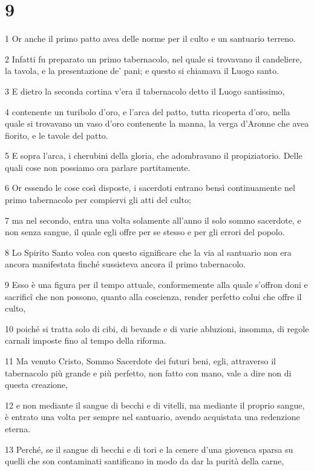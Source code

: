 \chapter{9}

\par 1 Or anche il primo patto avea delle norme per il culto e un santuario terreno.
\par 2 Infatti fu preparato un primo tabernacolo, nel quale si trovavano il candeliere, la tavola, e la presentazione de' pani; e questo si chiamava il Luogo santo.
\par 3 E dietro la seconda cortina v'era il tabernacolo detto il Luogo santissimo,
\par 4 contenente un turibolo d'oro, e l'arca del patto, tutta ricoperta d'oro, nella quale si trovavano un vaso d'oro contenente la manna, la verga d'Aronne che avea fiorito, e le tavole del patto.
\par 5 E sopra l'arca, i cherubini della gloria, che adombravano il propiziatorio. Delle quali cose non possiamo ora parlare partitamente.
\par 6 Or essendo le cose così disposte, i sacerdoti entrano bensì continuamente nel primo tabernacolo per compiervi gli atti del culto;
\par 7 ma nel secondo, entra una volta solamente all'anno il solo sommo sacerdote, e non senza sangue, il quale egli offre per se stesso e per gli errori del popolo.
\par 8 Lo Spirito Santo volea con questo significare che la via al santuario non era ancora manifestata finché sussisteva ancora il primo tabernacolo.
\par 9 Esso è una figura per il tempo attuale, conformemente alla quale s'offron doni e sacrificî che non possono, quanto alla coscienza, render perfetto colui che offre il culto,
\par 10 poiché si tratta solo di cibi, di bevande e di varie abluzioni, insomma, di regole carnali imposte fino al tempo della riforma.
\par 11 Ma venuto Cristo, Sommo Sacerdote dei futuri beni, egli, attraverso il tabernacolo più grande e più perfetto, non fatto con mano, vale a dire non di questa creazione,
\par 12 e non mediante il sangue di becchi e di vitelli, ma mediante il proprio sangue, è entrato una volta per sempre nel santuario, avendo acquistata una redenzione eterna.
\par 13 Perché, se il sangue di becchi e di tori e la cenere d'una giovenca sparsa su quelli che son contaminati santificano in modo da dar la purità della carne,
